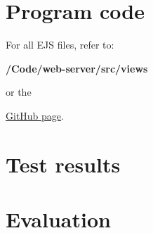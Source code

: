 \documentclass[a4paper,10pt]{article}
\begin{document}
\newpage
\section{Program code}
\lstset{style=code}


\newpage






\par
For all EJS files, refer to: \par
{\centering \textbf{/Code/web-server/src/views} \par}
or the
{\centering \href{https://github.com/stl12033/Arduino-Programming/tree/main/Code/web-server/src/views}{GitHub page}.\par}
\section{Test results}


\section{Evaluation}
\end{document}
